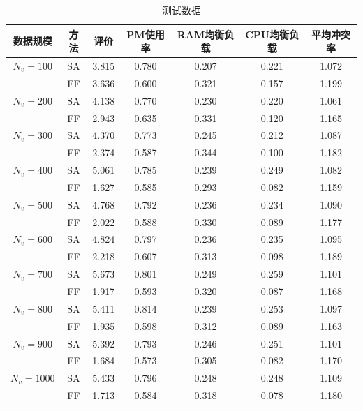 \begin{table}[htbp]
  \centering
  \small
  \begin{threeparttable}
    \caption{\label{tab:result}测试数据}
    \begin{tabular}{ccccccc}
      \toprule
数据规模       & 方法 & 评价  & PM使用率 & RAM均衡负载 & CPU均衡负载 & 平均冲突率 \\
      \midrule
$ N_v = 100 $ & SA & 3.815 & 0.780 & 0.207 & 0.221 & 1.072 \\ 
              & FF & 3.636 & 0.600 & 0.321 & 0.157 & 1.199 \\ 
\hline 
$ N_v = 200 $ & SA & 4.138 & 0.770 & 0.230 & 0.220 & 1.061 \\ 
              & FF & 2.943 & 0.635 & 0.331 & 0.120 & 1.165 \\ 
\hline
$ N_v = 300 $ & SA & 4.370 & 0.773 & 0.245 & 0.212 & 1.087 \\ 
              & FF & 2.374 & 0.587 & 0.344 & 0.100 & 1.182 \\ 
\hline
$ N_v = 400 $ & SA & 5.061 & 0.785 & 0.239 & 0.249 & 1.082 \\
              & FF & 1.627 & 0.585 & 0.293 & 0.082 & 1.159 \\ 
\hline
$ N_v = 500 $ & SA & 4.768 & 0.792 & 0.236 & 0.234 & 1.090 \\ 
              & FF & 2.022 & 0.588 & 0.330 & 0.089 & 1.177 \\ 
\hline
$ N_v = 600 $ & SA & 4.824 & 0.797 & 0.236 & 0.235 & 1.095 \\
              & FF & 2.218 & 0.607 & 0.313 & 0.098 & 1.189 \\
\hline
$ N_v = 700 $ & SA & 5.673 & 0.801 & 0.249 & 0.259 & 1.101 \\
              & FF & 1.917 & 0.593 & 0.320 & 0.087 & 1.168 \\ 
\hline
$ N_v = 800 $ & SA & 5.411 & 0.814 & 0.239 & 0.253 & 1.097 \\ 
              & FF & 1.935 & 0.598 & 0.312 & 0.089 & 1.163 \\
\hline
$ N_v = 900 $ & SA & 5.392 & 0.793 & 0.246 & 0.251 & 1.101 \\ 
              & FF & 1.684 & 0.573 & 0.305 & 0.082 & 1.170 \\ 
\hline
$ N_v = 1000 $ & SA & 5.433 & 0.796 & 0.248 & 0.248 & 1.109 \\ 
               & FF & 1.713 & 0.584 & 0.318 & 0.078 & 1.180 \\

      \bottomrule
    \end{tabular}
  \end{threeparttable}
\end{table}

